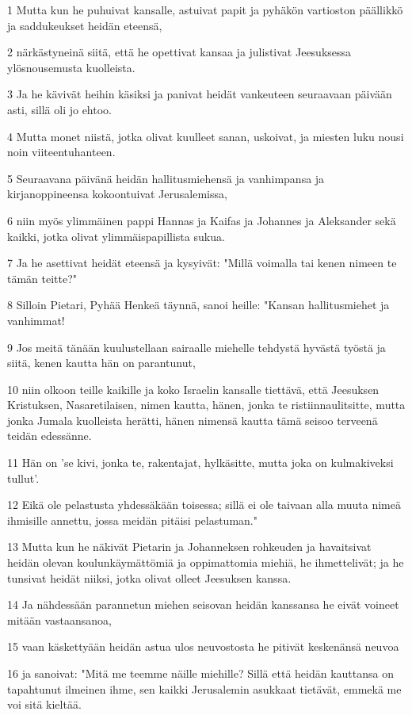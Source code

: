 \par 1 Mutta kun he puhuivat kansalle, astuivat papit ja pyhäkön vartioston päällikkö ja saddukeukset heidän eteensä,
\par 2 närkästyneinä siitä, että he opettivat kansaa ja julistivat Jeesuksessa ylösnousemusta kuolleista.
\par 3 Ja he kävivät heihin käsiksi ja panivat heidät vankeuteen seuraavaan päivään asti, sillä oli jo ehtoo.
\par 4 Mutta monet niistä, jotka olivat kuulleet sanan, uskoivat, ja miesten luku nousi noin viiteentuhanteen.
\par 5 Seuraavana päivänä heidän hallitusmiehensä ja vanhimpansa ja kirjanoppineensa kokoontuivat Jerusalemissa,
\par 6 niin myös ylimmäinen pappi Hannas ja Kaifas ja Johannes ja Aleksander sekä kaikki, jotka olivat ylimmäispapillista sukua.
\par 7 Ja he asettivat heidät eteensä ja kysyivät: "Millä voimalla tai kenen nimeen te tämän teitte?"
\par 8 Silloin Pietari, Pyhää Henkeä täynnä, sanoi heille: "Kansan hallitusmiehet ja vanhimmat!
\par 9 Jos meitä tänään kuulustellaan sairaalle miehelle tehdystä hyvästä työstä ja siitä, kenen kautta hän on parantunut,
\par 10 niin olkoon teille kaikille ja koko Israelin kansalle tiettävä, että Jeesuksen Kristuksen, Nasaretilaisen, nimen kautta, hänen, jonka te ristiinnaulitsitte, mutta jonka Jumala kuolleista herätti, hänen nimensä kautta tämä seisoo terveenä teidän edessänne.
\par 11 Hän on 'se kivi, jonka te, rakentajat, hylkäsitte, mutta joka on kulmakiveksi tullut'.
\par 12 Eikä ole pelastusta yhdessäkään toisessa; sillä ei ole taivaan alla muuta nimeä ihmisille annettu, jossa meidän pitäisi pelastuman."
\par 13 Mutta kun he näkivät Pietarin ja Johanneksen rohkeuden ja havaitsivat heidän olevan koulunkäymättömiä ja oppimattomia miehiä, he ihmettelivät; ja he tunsivat heidät niiksi, jotka olivat olleet Jeesuksen kanssa.
\par 14 Ja nähdessään parannetun miehen seisovan heidän kanssansa he eivät voineet mitään vastaansanoa,
\par 15 vaan käskettyään heidän astua ulos neuvostosta he pitivät keskenänsä neuvoa
\par 16 ja sanoivat: "Mitä me teemme näille miehille? Sillä että heidän kauttansa on tapahtunut ilmeinen ihme, sen kaikki Jerusalemin asukkaat tietävät, emmekä me voi sitä kieltää.
